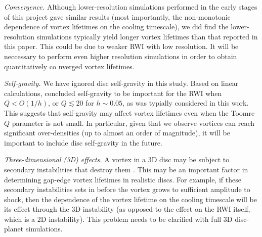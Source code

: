 \emph{Convergence.} Although lower-resolution simulations performed in
the early stages of this project gave similar results  
(most importantly, the non-monotonic dependence of vortex lifetimes on
the cooling timescale), we did find the lower-resolution simulations  
typically yield longer vortex lifetimes than that reported in this
paper. This could be due to weaker RWI with low resolution.  
It will be neccessary to perform even higher resolution  simulations
in order to obtain quantitatively co nverged vortex lifetimes.  
 
\emph{Self-gravity.} We have ignored disc self-gravity in this
study. Based on linear calculations, \cite{lovelace13} concluded
self-gravity to be important for the RWI when $Q<O(1/h)$, or
$Q\lesssim 20$ for $h\sim0.05$, as was typially considered in this
work. This suggests that self-gravity may affect vortex lifetimes even
when the Toomre $Q$ parameter is not small. In particular, given that
we observe vortices can reach significant over-densities (up to almost
an order of magnitude), it will be important to include disc
self-gravity in the future. %
 
\emph{Three-dimensional (3D) effects.} A vortex in a 3D disc may be
subject to secondary instabilities that destroy them
\citep{lesur09,railton14}. This may be an important factor in
determining gap-edge vortex lifetimes in realistic discs. For example,
if these secondary instabilities sets in before the vortex grows to
sufficient amplitude to shock, then the dependence of the vortex
lifetime on the cooling timescale will be its effect through the 3D
instability (as opposed to the effect on the RWI itself, which is a 2D
instability). This problem needs to be clarified with full 3D
disc-planet simulations.  

